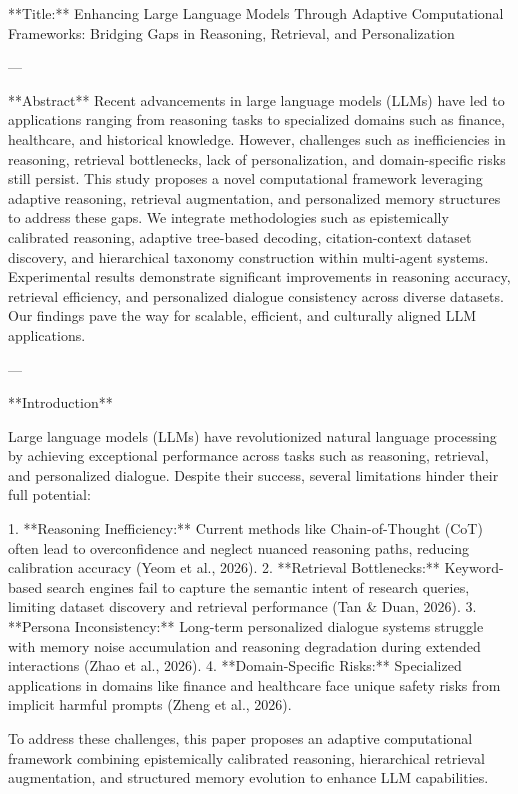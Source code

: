 **Title:** Enhancing Large Language Models Through Adaptive Computational Frameworks: Bridging Gaps in Reasoning, Retrieval, and Personalization  

---

**Abstract**  
Recent advancements in large language models (LLMs) have led to applications ranging from reasoning tasks to specialized domains such as finance, healthcare, and historical knowledge. However, challenges such as inefficiencies in reasoning, retrieval bottlenecks, lack of personalization, and domain-specific risks still persist. This study proposes a novel computational framework leveraging adaptive reasoning, retrieval augmentation, and personalized memory structures to address these gaps. We integrate methodologies such as epistemically calibrated reasoning, adaptive tree-based decoding, citation-context dataset discovery, and hierarchical taxonomy construction within multi-agent systems. Experimental results demonstrate significant improvements in reasoning accuracy, retrieval efficiency, and personalized dialogue consistency across diverse datasets. Our findings pave the way for scalable, efficient, and culturally aligned LLM applications.  

---

**Introduction**  

Large language models (LLMs) have revolutionized natural language processing by achieving exceptional performance across tasks such as reasoning, retrieval, and personalized dialogue. Despite their success, several limitations hinder their full potential:

1. **Reasoning Inefficiency:** Current methods like Chain-of-Thought (CoT) often lead to overconfidence and neglect nuanced reasoning paths, reducing calibration accuracy (Yeom et al., 2026).
2. **Retrieval Bottlenecks:** Keyword-based search engines fail to capture the semantic intent of research queries, limiting dataset discovery and retrieval performance (Tan & Duan, 2026).
3. **Persona Inconsistency:** Long-term personalized dialogue systems struggle with memory noise accumulation and reasoning degradation during extended interactions (Zhao et al., 2026).
4. **Domain-Specific Risks:** Specialized applications in domains like finance and healthcare face unique safety risks from implicit harmful prompts (Zheng et al., 2026).

To address these challenges, this paper proposes an adaptive computational framework combining epistemically calibrated reasoning, hierarchical retrieval augmentation, and structured memory evolution to enhance LLM capabilities.  

